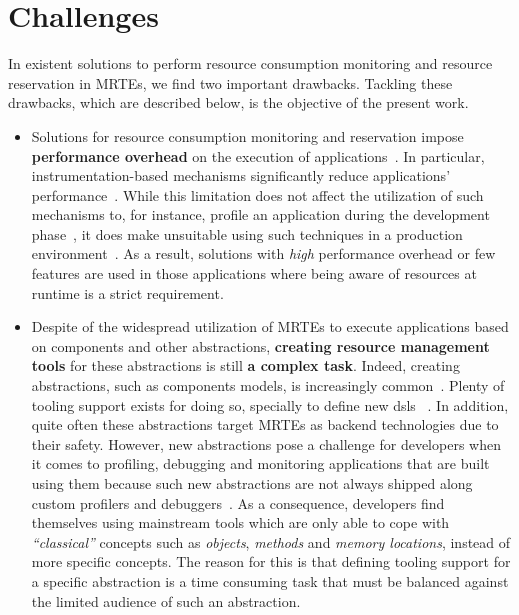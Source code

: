 \section{Challenges} \label{sec:intro-challenges}

In existent solutions to perform resource consumption monitoring and resource reservation in MRTEs, we find two important drawbacks.
Tackling these drawbacks, which are described below, is the objective of the present work.

\begin{itemize}
\item Solutions for resource consumption monitoring and reservation impose \textbf{performance overhead} on the execution of applications~\cite{Binder:2006:FEM:1173706.1173733,Marek:2012:DEL:2162037.2162046,Reiss:2008:CDP:1383559.1383566,Maurel:2012:AME:2304736.2304763}.
In particular, instrumentation-based mechanisms significantly reduce applications' performance~\cite{Dmitriev:2004:PJA:974043.974067,czajkowski_jres:_1998,Binder:2009:PPV:1464245.1464249}.
While this limitation does not affect the utilization of such mechanisms to, for instance, profile an application during the development phase~\cite{czajkowski_jres:_1998,binder_extending_2005,binder_portable_2001,Maebe06javana:a,Moret:2011:PBI:1960275.1960292, Hulaas:2008:PTL}, it does make unsuitable using such techniques in a production environment~\cite{Dmitriev:2004:PJA:974043.974067}.
As a result, solutions with \textit{high} performance overhead or few features are used in those applications where being aware of resources at runtime is a strict requirement.

\item Despite of the widespread utilization of MRTEs to execute applications based on components and other abstractions, \textbf{creating resource management tools} for these abstractions is still \textbf{a complex task}.
Indeed, creating abstractions, such as components models, is increasingly common~\cite{van2000domain,hutchinson2011empirical,whittle2014state}.
Plenty of tooling support exists for doing so, specially to define new \glspl{dsl} ~\cite{van2000domain,Fowler:2010:DSL:1809745,raey,Merkle:2010:TMT:1869542.1869564,Eysholdt:2010:XIY:1869542.1869625}.
In addition, quite often these abstractions target MRTEs as backend technologies due to their safety.
However, new abstractions pose a challenge for developers when it comes to profiling, debugging and monitoring applications that are built using them because such new abstractions are not always shipped along custom profilers and debuggers~\cite{Kolomvatsos:2012:DAC:2148250.2148478,Wu:2008:GGD:1394966.1394970,Mannadiar:2010:DDM:1964571.1964595,Lindeman:2011:DDD:2047862.2047885,Wu:2005:TDL:1094855.1094920,Faith1998}.
As a consequence, developers find themselves using mainstream tools which are only able to cope with \textit{``classical''} concepts such as \textit{objects}, \textit{methods} and \textit{memory locations}, instead of more specific concepts.
The reason for this is that defining tooling support for a specific abstraction is a time consuming task that must be balanced against the limited audience of such an abstraction.
\end{itemize}
 
